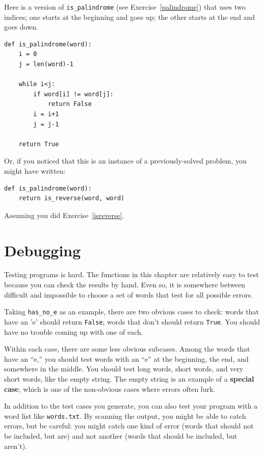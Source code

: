 \documentclass[10pt]{book}
\begin{document}
Here is a version of \verb"is_palindrome" (see
Exercise~\ref{palindrome}) that uses two indices; one starts at the
beginning and goes up; the other starts at the end and goes down.

\begin{verbatim}
def is_palindrome(word):
    i = 0
    j = len(word)-1

    while i<j:
        if word[i] != word[j]:
            return False
        i = i+1
        j = j-1

    return True
\end{verbatim}

Or, if you noticed that this is an instance of a previously-solved
problem, you might have written:

\begin{verbatim}
def is_palindrome(word):
    return is_reverse(word, word)
\end{verbatim}

Assuming you did Exercise~\ref{isreverse}.


\section{Debugging}

Testing programs is hard.  The functions in this chapter are
relatively easy to test because you can check the results by hand.
Even so, it is somewhere between difficult and impossible to choose a
set of words that test for all possible errors.

Taking \verb"has_no_e" as an example, there are two obvious
cases to check: words that have an 'e' should return {\tt False};
words that don't should return {\tt True}.  You should have no
trouble coming up with one of each.

Within each case, there are some less obvious subcases.  Among the
words that have an ``e,'' you should test words with an ``e'' at the
beginning, the end, and somewhere in the middle.  You should test long
words, short words, and very short words, like the empty string.  The
empty string is an example of a {\bf special case}, which is one of
the non-obvious cases where errors often lurk.

In addition to the test cases you generate, you can also test
your program with a word list like {\tt words.txt}.  By scanning
the output, you might be able to catch errors, but be careful:
you might catch one kind of error (words that should not be
included, but are) and not another (words that should be included,
but aren't).
\end{document}
